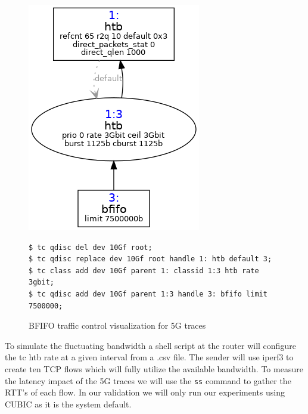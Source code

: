 \documentclass[a4paper,english, 11pt]{report}
\begin{document}
\begin{figure}[h!] %
	\centering
	\includegraphics[scale=0.60]{../diagrams/tc/tc_5g_bfifo.png}
  	\begin{verbatim}
$ tc qdisc del dev 10Gf root; 
$ tc qdisc replace dev 10Gf root handle 1: htb default 3;
$ tc class add dev 10Gf parent 1: classid 1:3 htb rate 3gbit;
$ tc qdisc add dev 10Gf parent 1:3 handle 3: bfifo limit 7500000;
	\end{verbatim}
	\caption{BFIFO traffic control visualization for 5G traces}
  	\label{fig:tc_5g_bfifo}
\end{figure}

To simulate the fluctuating bandwidth a shell script at the router will configure the tc htb rate at a given interval from a .csv file. The sender will use iperf3 to create ten TCP flows which will fully utilize the available bandwidth. To measure the latency impact of the 5G traces we will use the \verb|ss| command to gather the RTT's of each flow. In our validation we will only run our experiments using CUBIC as it is the system default.\\

\end{document}
